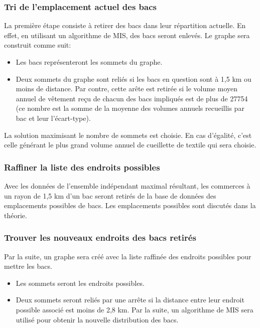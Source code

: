 \documentclass[11pt]{article}
\begin{document}
\subsubsection{Tri de l'emplacement actuel des bacs}
La première étape consiste à retirer des bacs dans leur répartition actuelle. En effet, en utilisant un algorithme de MIS, des bacs seront enlevés. Le graphe sera construit comme suit:
\begin{itemize}
    \item Les bacs représenteront les sommets du graphe.
    \item Deux sommets du graphe sont reliés si les bacs en question sont à 1,5 km ou moins de distance. Par contre, cette arête est retirée si le volume moyen annuel de vêtement reçu de chacun des bacs impliqués est de plus de 27754 (ce nombre est la somme de la moyenne des volumes annuels recueillis par bac et leur l'écart-type). 
\end{itemize}
La solution maximisant le nombre de sommets est choisie. En cas d’égalité, c'est celle générant le plus grand volume annuel de cueillette de textile qui sera choisie.

\subsubsection{Raffiner la liste des endroits possibles}
Avec les données de l’ensemble indépendant maximal résultant, les commerces à un rayon de 1,5 km d'un bac seront retirés de la base de données des emplacements possibles de bacs. Les emplacements possibles sont discutés dans la théorie.

\subsubsection{Trouver les nouveaux endroits des bacs retirés}
Par la suite, un graphe sera créé avec la liste raffinée des endroits possibles pour mettre les bacs.
\begin{itemize}
    \item Les sommets seront les endroits possibles.
    \item Deux sommets seront reliés par une arrête si la distance entre leur endroit possible associé est moins de 2,8 km. Par la suite, un algorithme de MIS sera utilisé pour obtenir la nouvelle distribution des bacs.
\end{itemize}
\end{document}
